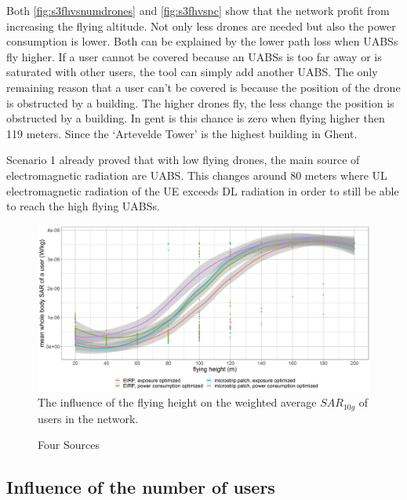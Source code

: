 Both \ref{fig:s3fhvsnumdrones} and \ref{fig:s3fhvspc} show that the network profit from increasing the flying altitude. 
Not only less drones are needed but also the power consumption is lower. Both can be explained by the lower path loss when \gls{UABS}s fly higher.
If a user cannot be covered because an \gls{UABS}s is too far away or is saturated with other users, 
the tool can simply add another \gls{UABS}. The only remaining reason that a user can’t be covered is because the position of 
the drone is obstructed by a building. The higher drones fly, the less change the position is obstructed by a building. 
In gent is this chance is zero when flying higher then 119 meters. Since the `Artevelde Tower' is the highest building in Ghent.

Scenario 1 already proved that with low flying drones, the main source of electromagnetic radiation are \gls{UABS}. 
This changes around 80 meters where \gls{UL} electromagnetic radiation of the \gls{UE}
 exceeds \gls{DL} radiation in order to still be able to reach the high flying \gls{UABS}s.

\begin{figure}[]
  \includegraphics[width=\textwidth]{../results/s3/fhvssar.png}
  \caption{The influence of the flying height on the weighted average $SAR_{10g}$ of users in the network.}
  \label{fig:s3fhvssar}
\end{figure}

\begin{figure}[]
  \caption{Four Sources}
  \label{fig:s3fhvssar}
\end{figure}

\FloatBarrier
\subsection{Influence of the number of users}
\label{S3B}

